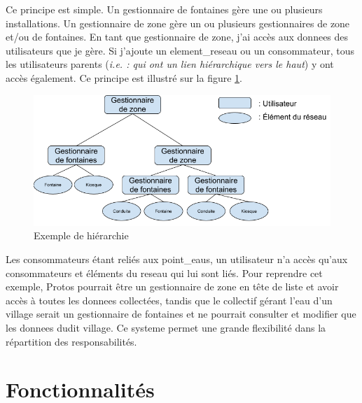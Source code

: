 \documentclass[a4paper, 11pt]{article}
\begin{document}
    Ce principe est simple. Un gestionnaire de \glspl{fontaine} gère une ou plusieurs installations. Un gestionnaire de \gls{zone} gère un ou plusieurs gestionnaires de \gls{zone} et/ou de \glspl{fontaine}. En tant que gestionnaire de \gls{zone}, j'ai accès aux \glspl{donnee} des \glspl{utilisateur} que je gère. Si j'ajoute un \gls{element_reseau} ou un \gls{consommateur}, tous les \glspl{utilisateur} parents (\emph{i.e. : qui ont un lien hiérarchique vers le haut}) y ont accès également. Ce principe est illustré sur la figure \ref{fig:hierarchie}.

    \begin{figure}[H]
      \centering
      \includegraphics[width=.8\textwidth]{Cahier_des_Charges/principe_hierarchique}
      \caption{Exemple de hiérarchie}
      \label{fig:hierarchie}
    \end{figure}

    Les \glspl{consommateur} étant reliés aux \glspl{point_eau}, un \gls{utilisateur} n'a accès qu'aux \glspl{consommateur} et éléments du \gls{reseau} qui lui sont liés. Pour reprendre cet exemple, Protos pourrait être un gestionnaire de \gls{zone} en tête de liste et avoir accès à toutes les \glspl{donnee} collectées, tandis que le collectif gérant l'eau d'un village serait un gestionnaire de \glspl{fontaine} et ne pourrait consulter et modifier que les \glspl{donnee} dudit village. Ce \gls{systeme} permet une grande flexibilité dans la répartition des responsabilités.
\section{Fonctionnalités}
\end{document}

